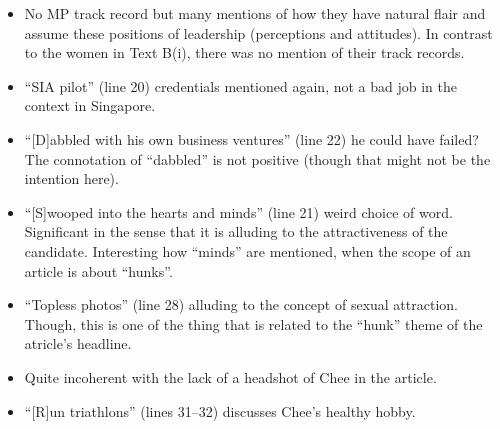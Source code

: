 \documentclass[../main.tex]{subfiles}
\begin{document}
\begin{itemize}
\begin{itemize}
						\item No MP track record but many mentions of how they have natural flair and assume these positions of leadership (perceptions and attitudes). In contrast to the women in Text B(i), there was no mention of their track records.
						\item ``SIA pilot'' (line 20) credentials mentioned again, not a bad job in the context in Singapore. 
						\item ``[D]abbled with his own business ventures'' (line 22) he could have failed? The connotation of ``dabbled'' is not positive (though that might not be the intention here).
						\item ``[S]wooped into the hearts and minds'' (line 21) weird choice of word. Significant in the sense that it is alluding to the attractiveness of the candidate. Interesting how ``minds'' are mentioned, when the scope of an article is about ``hunks''.
						\item ``Topless photos'' (line 28) alluding to the concept of sexual attraction. Though, this is one of the thing that is related to the ``hunk'' theme of the atricle's headline.
						\item Quite incoherent with the lack of a headshot of Chee in the article.
						\item ``[R]un triathlons'' (lines 31--32) discusses Chee's healthy hobby.
					\end{itemize}
				\end{itemize}
\end{document}
